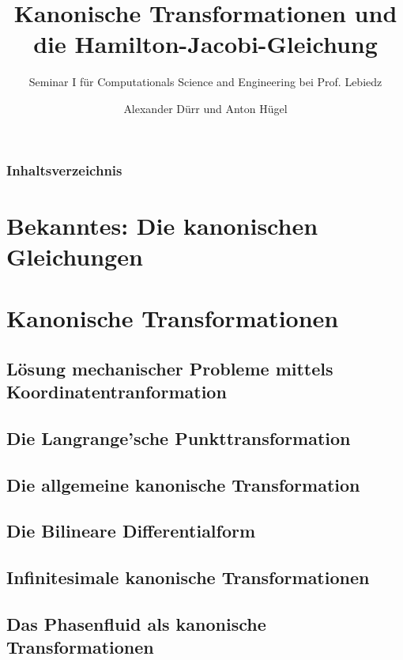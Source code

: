 \documentclass{beamer}
\title{Kanonische Transformationen und die Hamilton-Jacobi-Gleichung}
\subtitle{Seminar I für Computationals Science and Engineering bei Prof. Lebiedz}
\author{Alexander Dürr und Anton Hügel}
\institute
{\\Universität Ulm, Institut für Numerische Mathematik}
\begin{document}
\hspace*{-1.49cm}
\frame[plain]{\titlepage}

\hspace*{-0.7cm}
\begin{frame}
  \frametitle{Inhaltsverzeichnis}
  \tableofcontents
\end{frame}


\section{Bekanntes: Die kanonischen Gleichungen}

\section{Kanonische Transformationen}
    

    \subsection{Lösung mechanischer Probleme mittels Koordinatentranformation}
    
    
    \subsection{Die Langrange'sche Punkttransformation}
    
    
    \subsection{Die allgemeine kanonische Transformation}
    
    
    \subsection{Die Bilineare Differentialform}
    
    \subsection{Infinitesimale kanonische Transformationen}
    
    \subsection{Das Phasenfluid als kanonische Transformationen}
    
\end{document}
